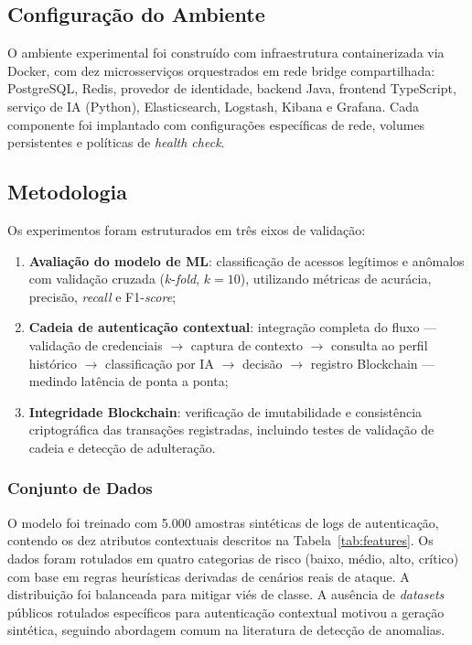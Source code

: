 \documentclass[12pt]{article}
\begin{document}
\subsection{Configuração do Ambiente}

O ambiente experimental foi construído com infraestrutura containerizada via Docker, com dez microsserviços orquestrados em rede bridge compartilhada: PostgreSQL, Redis, provedor de identidade, backend Java, frontend TypeScript, serviço de IA (Python), Elasticsearch, Logstash, Kibana e Grafana. Cada componente foi implantado com configurações específicas de rede, volumes persistentes e políticas de \textit{health check}.

\subsection{Metodologia}

Os experimentos foram estruturados em três eixos de validação:

\begin{enumerate}[leftmargin=*]
    \item \textbf{Avaliação do modelo de ML}: classificação de acessos legítimos e anômalos com validação cruzada ($k$-\textit{fold}, $k=10$), utilizando métricas de acurácia, precisão, \textit{recall} e F1-\textit{score};
    \item \textbf{Cadeia de autenticação contextual}: integração completa do fluxo --- validação de credenciais $\rightarrow$ captura de contexto $\rightarrow$ consulta ao perfil histórico $\rightarrow$ classificação por IA $\rightarrow$ decisão $\rightarrow$ registro Blockchain --- medindo latência de ponta a ponta;
    \item \textbf{Integridade Blockchain}: verificação de imutabilidade e consistência criptográfica das transações registradas, incluindo testes de validação de cadeia e detecção de adulteração.
\end{enumerate}

\subsubsection{Conjunto de Dados}

O modelo foi treinado com 5.000 amostras sintéticas de logs de autenticação, contendo os dez atributos contextuais descritos na Tabela~\ref{tab:features}. Os dados foram rotulados em quatro categorias de risco (baixo, médio, alto, crítico) com base em regras heurísticas derivadas de cenários reais de ataque. A distribuição foi balanceada para mitigar viés de classe. A ausência de \textit{datasets} públicos rotulados específicos para autenticação contextual motivou a geração sintética, seguindo abordagem comum na literatura de detecção de anomalias.
\end{document}
